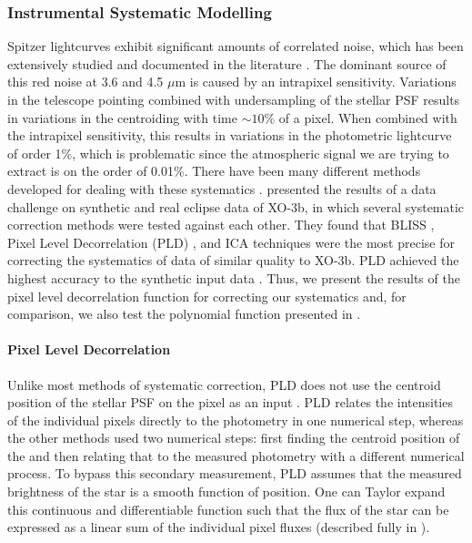 \subsubsection{Instrumental Systematic Modelling}
\label{P1:subsec:systematics}

Spitzer lightcurves exhibit significant amounts of correlated noise, which has been extensively studied and documented in the literature \citep{Charbonneau2005, Agol2010, Seager2010, Stevenson2010a}. The dominant source of this red noise at 3.6 and 4.5 $\mu$m is caused by an intrapixel sensitivity. Variations in the telescope pointing combined with undersampling of the stellar PSF results in variations in the centroiding with time $\sim10\%$ of a pixel. When combined with the intrapixel sensitivity, this results in variations in the photometric lightcurve of order 1\%, which is problematic since the atmospheric signal we are trying to extract is on the order of 0.01\%. There have been many different methods developed for dealing with these systematics \citep[e.g.,][]{Reach2005, Charbonneau2008, Ballard2010, Stevenson2012, Gibson2012, Morello2015, Deming2015}. \citet{Ingalls2016} presented the results of a data challenge on synthetic and real eclipse data of XO-3b, in which several systematic correction methods were tested against each other. They found that BLISS \citep{Stevenson2012}, Pixel Level Decorrelation (PLD) \citep{Deming2015}, and ICA techniques \citep{Morello2015} were the most precise for correcting the systematics of data of similar quality to XO-3b. PLD achieved the highest accuracy to the synthetic input data \citep{Deming2015}. Thus, we present the results of the pixel level decorrelation function for correcting our systematics and, for comparison, we also test the polynomial function presented in \citet{Knutson2008}.


\paragraph{Pixel Level Decorrelation}

Unlike most methods of systematic correction, PLD does not use the centroid position of the stellar PSF on the pixel as an input \citep{Deming2015}. PLD relates the intensities of the individual pixels directly to the photometry in one numerical step, whereas the other methods used two numerical steps: first finding the centroid position of the and then relating that to the measured photometry with a different numerical process. To bypass this secondary measurement, PLD assumes that the measured brightness of the star is a smooth function of position. One can Taylor expand this continuous and differentiable function such that the flux of the star can be expressed as a linear sum of the individual pixel fluxes (described fully in \citet{Deming2015}).


